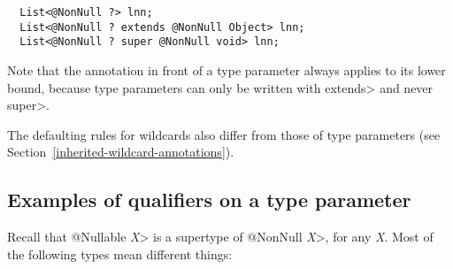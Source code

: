 \begin{Verbatim}
  List<@NonNull ?> lnn;
  List<@NonNull ? extends @NonNull Object> lnn;
  List<@NonNull ? super @NonNull void> lnn;
\end{Verbatim}

\noindent
Note that the annotation in front of a type parameter always applies to its
lower bound, because type parameters can only be written with \<extends>
and never \<super>.



The defaulting rules for
wildcards also differ from those of type parameters (see
Section~\ref{inherited-wildcard-annotations}).


%
%
%
%


\subsection{Examples of qualifiers on a type parameter\label{type-parameter-qualifier-examples}}

Recall that \<@Nullable \emph{X}> is a supertype of \<@NonNull \emph{X}>,
for any \emph{X}\@.
Most of the following types mean different things:

